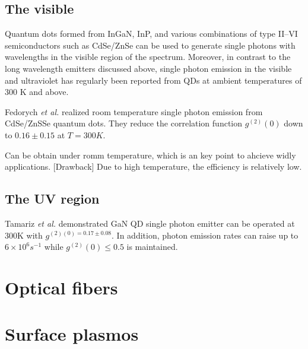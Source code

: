\documentclass[10pt]{article}
\begin{document}
            \subsection{The visible}
                Quantum dots formed from InGaN, InP, and various combinations of type II–VI semiconductors such as 
                CdSe/ZnSe can be used to generate single photons with wavelengths in the visible region of the spectrum.
                Moreover, in contrast to the long wavelength emitters discussed above, single photon emission in the visible 
                and ultraviolet has regularly been reported from QDs at ambient temperatures of 300 K and above.\par

                Fedorych \textit{et al.} realized room temperature single photon emission from CdSe/ZnSSe quantum dots. They reduce the correlation function
                $g^{(2)}(0)$ down to $0.16\pm0.15$ at $T=300K$\cite{fedorych_room_2012}.\par

                \begin{definition}
                    [Advantage] Can be obtain under romm temperature, which is an key point to ahcieve widly applications.
                    [Drawback] Due to high temperature, the efficiency is relatively low.
                \end{definition}

            \subsection{The UV region}
                Tamariz \textit{et al.} demonstrated GaN QD single photon emitter can be operated at 300K with $g^{(2)(0)= 0.17\pm 0.08}$. In addition,
                photon emission rates can raise up to $6\times 10^{6} s^{-1}$ while $g^{(2)}(0)\leq 0.5$ is maintained\cite{tamariz_towards_2020}.
        \section{Optical fibers}
        \section{Surface plasmos}


    
    
\end{document}
